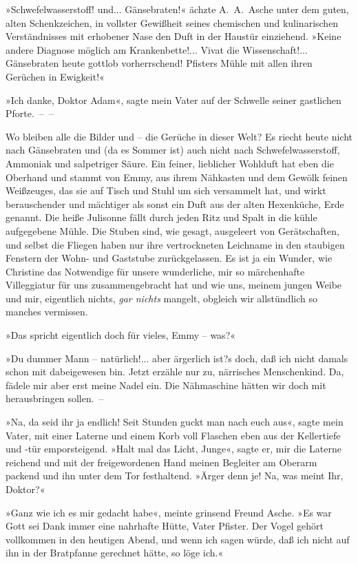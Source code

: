»Schwefelwasserstoff! und... Gänsebraten!« ächzte A.~A.~Asche unter
dem guten, alten Schenkzeichen, in vollster Gewißheit seines
chemischen und kulinarischen Verständnisses mit erhobener Nase den
Duft in der Haustür einziehend. »Keine andere Diagnose möglich am
Krankenbette!... Vivat die Wissenschaft!... Gänsebraten heute
gottlob vorherrschend! Pfisters Mühle mit allen ihren Gerüchen in
Ewigkeit!«

»Ich danke, Doktor Adam«, sagte mein Vater auf der Schwelle seiner
gastlichen Pforte.~–~–

Wo bleiben alle die Bilder und – die Gerüche in dieser Welt? Es
riecht heute nicht nach Gänsebraten und (da es Sommer ist) auch
nicht nach Schwefelwasserstoff, Ammoniak und salpetriger Säure. Ein
feiner, lieblicher Wohlduft hat eben die Oberhand und stammt von
Emmy, aus ihrem Nähkasten und dem Gewölk feinen Weißzeuges, das sie
auf Tisch und Stuhl um sich versammelt hat, und wirkt berauschender
und mächtiger als sonst ein Duft aus der alten Hexenküche, Erde
genannt. Die heiße Julisonne fällt durch jeden Ritz und Spalt in
die kühle aufgegebene Mühle. Die Stuben sind, wie gesagt,
ausgeleert von Gerätschaften, und selbst die Fliegen haben nur ihre
vertrockneten Leichname in den staubigen Fenstern der Wohn- und
Gaststube zurückgelassen. Es ist ja ein Wunder, wie Christine das
Notwendige für unsere wunderliche, mir so märchenhafte Villeggiatur
für uns zusammengebracht hat und wie uns, meinem jungen Weibe und
mir, eigentlich nichts, \emph{gar nichts} mangelt, obgleich wir
allstündlich so manches vermissen.

»Das spricht eigentlich doch für vieles, Emmy – was?«

»Du dummer Mann – natürlich!... aber ärgerlich ist?s doch, daß ich
nicht damals schon mit dabeigewesen bin. Jetzt erzähle nur zu,
närrisches Menschenkind. Da, fädele mir aber erst meine Nadel ein.
Die Nähmaschine hätten wir doch mit herausbringen sollen.~–

»Na, da seid ihr ja endlich! Seit Stunden guckt man nach euch aus«,
sagte mein Vater, mit einer Laterne und einem Korb voll Flaschen
eben aus der Kellertiefe und -tür emporsteigend. »Halt mal das
Licht, Junge«, sagte er, mir die Laterne reichend und mit der
freigewordenen Hand meinen Begleiter am Oberarm packend und ihn
unter dem Tor festhaltend. »Ärger denn je! Na, was meint Ihr,
Doktor?«

»Ganz wie ich es mir gedacht habe«, meinte grinsend Freund Asche.
»Es war Gott sei Dank immer eine nahrhafte Hütte, Vater Pfister.
Der Vogel gehört vollkommen in den heutigen Abend, und wenn ich
sagen würde, daß ich nicht auf ihn in der Bratpfanne gerechnet
hätte, so löge ich.«

